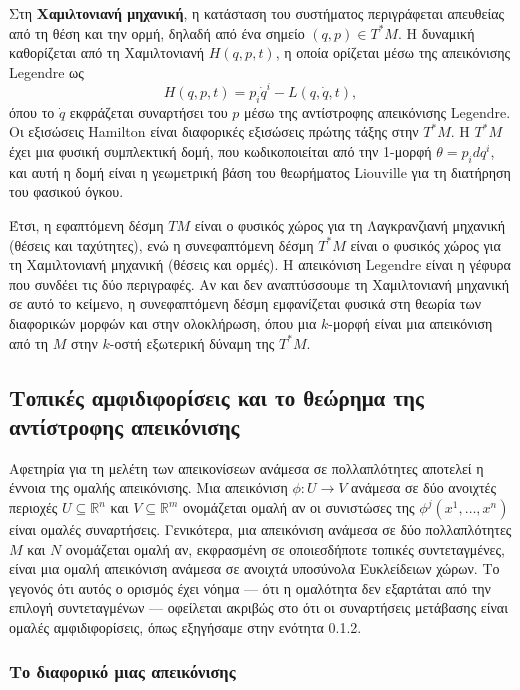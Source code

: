 \documentclass[12pt]{article}
\begin{document}
Στη \textbf{Χαμιλτονιανή μηχανική}, η κατάσταση του συστήματος περιγράφεται απευθείας από τη θέση και την ορμή, δηλαδή από ένα σημείο $(q, p) \in T^*M$. Η δυναμική καθορίζεται από τη Χαμιλτονιανή $H(q, p, t)$, η οποία ορίζεται μέσω της απεικόνισης Legendre ως
\[
H(q, p, t) = p_i \dot{q}^i - L(q, \dot{q}, t),
\]
όπου το $\dot{q}$ εκφράζεται συναρτήσει του $p$ μέσω της αντίστροφης απεικόνισης Legendre. Οι εξισώσεις Hamilton είναι διαφορικές εξισώσεις πρώτης τάξης στην $T^*M$. Η $T^*M$ έχει μια φυσική συμπλεκτική δομή, που κωδικοποιείται από την 1-μορφή $\theta = p_i dq^i$, και αυτή η δομή είναι η γεωμετρική βάση του θεωρήματος Liouville για τη διατήρηση του φασικού όγκου.

Έτσι, η εφαπτόμενη δέσμη $TM$ είναι ο φυσικός χώρος για τη Λαγκρανζιανή μηχανική (θέσεις και ταχύτητες), ενώ η συνεφαπτόμενη δέσμη $T^*M$ είναι ο φυσικός χώρος για τη Χαμιλτονιανή μηχανική (θέσεις και ορμές). Η απεικόνιση Legendre είναι η γέφυρα που συνδέει τις δύο περιγραφές. Αν και δεν αναπτύσσουμε τη Χαμιλτονιανή μηχανική σε αυτό το κείμενο, η συνεφαπτόμενη δέσμη εμφανίζεται φυσικά στη θεωρία των διαφορικών μορφών και στην ολοκλήρωση, όπου μια $k$-μορφή είναι μια απεικόνιση από τη $M$ στην $k$-οστή εξωτερική δύναμη της $T^*M$.

\subsection{Τοπικές αμφιδιφορίσεις και το θεώρημα της αντίστροφης απεικόνισης}

Αφετηρία για τη μελέτη των απεικονίσεων ανάμεσα σε πολλαπλότητες αποτελεί η έννοια της ομαλής απεικόνισης. Μια απεικόνιση $\phi: U \to V$ ανάμεσα σε δύο ανοιχτές περιοχές $U \subseteq \mathbb{R}^n$ και $V \subseteq \mathbb{R}^m$ ονομάζεται ομαλή αν οι συνιστώσες της $\phi^j(x^1, \dots, x^n)$ είναι ομαλές συναρτήσεις. Γενικότερα, μια απεικόνιση ανάμεσα σε δύο πολλαπλότητες $M$ και $N$ ονομάζεται ομαλή αν, εκφρασμένη σε οποιεσδήποτε τοπικές συντεταγμένες, είναι μια ομαλή απεικόνιση ανάμεσα σε ανοιχτά υποσύνολα Ευκλείδειων χώρων. Το γεγονός ότι αυτός ο ορισμός έχει νόημα --- ότι η ομαλότητα δεν εξαρτάται από την επιλογή συντεταγμένων --- οφείλεται ακριβώς στο ότι οι συναρτήσεις μετάβασης είναι ομαλές αμφιδιφορίσεις, όπως εξηγήσαμε στην ενότητα 0.1.2.

\subsubsection{Το διαφορικό μιας απεικόνισης}
\end{document}
